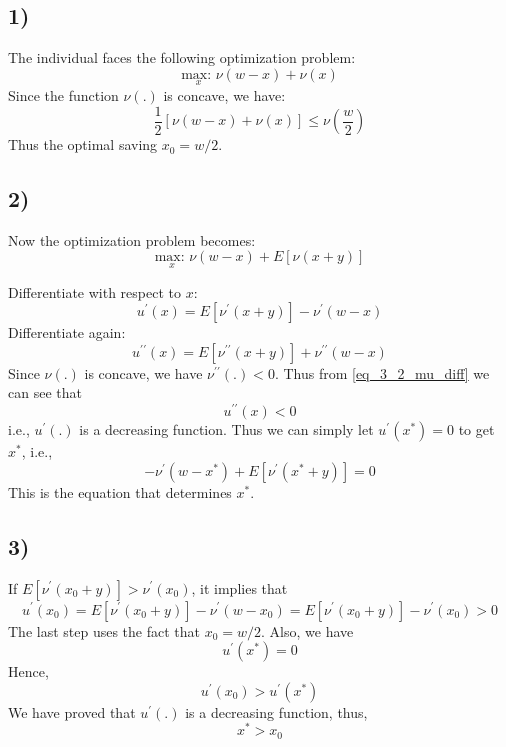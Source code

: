 \documentclass{article}
\begin{document}
\subsection*{1)}
The individual faces the following optimization problem:
	\begin{equation}
		\underset{x}{\text{max: }}\nu(w-x) + \nu(x)
	\end{equation}
	Since the function $\nu(.)$ is concave, we have:
	\begin{equation}
		\frac{1}{2} \left[ \nu(w-x)+ \nu(x) \right] \leq \nu\left( \frac{w}{2} \right)
	\end{equation}
	Thus the optimal saving $x_0 = w/2$.
\subsection*{2)}
Now the optimization problem becomes:
	\begin{equation}
		\underset{x}{\text{max: }}\nu(w-x) + E[\nu(x+y)]
	\end{equation}
	
	Differentiate with respect to $x$: 
	\begin{equation}
		u^{\prime}(x) = E\left[ \nu^{\prime}(x+y)\right] -\nu^{\prime}(w-x)
	\end{equation}
	Differentiate again:
	\begin{equation}
		\label{eq_3_2_mu_diff}
		u^{\prime\prime}(x) = E\left[ \nu^{\prime\prime}(x+y)\right] + \nu^{\prime\prime}(w-x)
	\end{equation}
	Since $\nu(.)$ is concave, we have $\nu^{\prime\prime}(.) < 0$. Thus from \eqref{eq_3_2_mu_diff} we can see that 
	\begin{equation}
		u^{\prime\prime}(x) < 0
	\end{equation}
	i.e., $u^{\prime}(.)$ is a decreasing function. Thus we can simply let $u^{\prime}(x^{*})=0$ to get $x^{*}$, i.e.,
	\begin{equation}
		\label{eq_3_2_def_x_star}
		-\nu^{\prime}(w-x^{*}) + E\left[\nu^{\prime}(x^{*}+y)\right] = 0
	\end{equation}
	This is the equation that determines $x^{*}$.
\subsection*{3)} 
If $E\left[\nu^{\prime}(x_0+y)\right]>\nu^{\prime}(x_0)$, it implies that 
	\begin{equation}
		u^{\prime}(x_0) = E\left[ \nu^{\prime}(x_0+y)\right] -\nu^{\prime}(w-x_0) = E\left[ \nu^{\prime}(x_0+y)\right] -\nu^{\prime}(x_0) > 0
	\end{equation}
	The last step uses the fact that $x_0 = w/2$. Also, we have 
	\begin{equation}
		u^{\prime}(x^{*}) = 0
	\end{equation}
	Hence,  
	\begin{equation}
		u^{\prime}(x_0) > u^{\prime}(x^{*})
	\end{equation}
	We have proved that $u^{\prime}(.)$ is a decreasing function, thus, 
	\begin{equation}
		x^{*} > x_0
	\end{equation}
\end{document}
